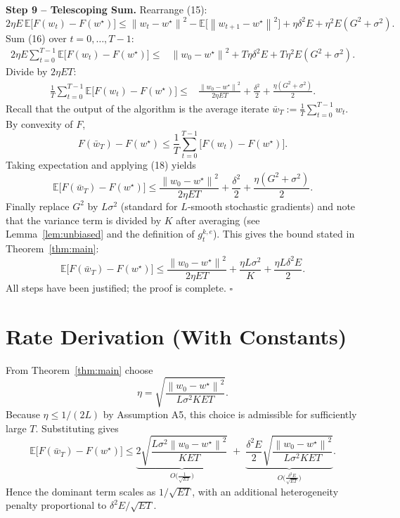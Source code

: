 \documentclass{article}
\newcommand{\E}{\mathbb{E}}
\newcommand{\norm}[1]{\left\|#1\right\|}
\begin{document}
\bigskip
\noindent\textbf{Step 9 – Telescoping Sum.}  
Rearrange (15):
\[
2\eta E\,\E\!\bigl[F(w_t)-F(w^\star)\bigr]
\le
\norm{w_t-w^\star}^{2}
-\E\!\bigl[\norm{w_{t+1}-w^\star}^{2}\bigr]
+ \eta\delta^{2}E
+ \eta^{2}E(G^{2}+\sigma^{2}). \tag{16}
\]
Sum (16) over $t=0,\dots,T-1$:
\begin{align}
2\eta E\sum_{t=0}^{T-1}\E\!\bigl[F(w_t)-F(w^\star)\bigr]
\le &
\norm{w_0-w^\star}^{2}
+ T\eta\delta^{2}E
+ T\eta^{2}E(G^{2}+\sigma^{2}). \tag{17}
\end{align}
Divide by $2\eta E T$:
\begin{align}
\frac1T\sum_{t=0}^{T-1}\E\!\bigl[F(w_t)-F(w^\star)\bigr]
\le &
\frac{\norm{w_0-w^\star}^{2}}{2\eta E T}
+ \frac{\delta^{2}}{2}
+ \frac{\eta(G^{2}+\sigma^{2})}{2}. \tag{18}
\end{align}
Recall that the output of the algorithm is the average iterate
$\bar w_T:=\frac1T\sum_{t=0}^{T-1} w_t$. By convexity of $F$,
\[
F(\bar w_T)-F(w^\star)\le \frac1T\sum_{t=0}^{T-1}\bigl[F(w_t)-F(w^\star)\bigr].
\]
Taking expectation and applying (18) yields
\[
\E\!\bigl[F(\bar w_T)-F(w^\star)\bigr]
\le
\frac{\norm{w_0-w^\star}^{2}}{2\eta E T}
+ \frac{\delta^{2}}{2}
+ \frac{\eta(G^{2}+\sigma^{2})}{2}.
\]
Finally replace $G^{2}$ by $L\sigma^{2}$ (standard for $L$‑smooth stochastic gradients) and note that the variance term is divided by $K$ after averaging (see Lemma~\ref{lem:unbiased} and the definition of $g_{t}^{k,e}$). This gives the bound stated in Theorem~\ref{thm:main}:
\[
\E\!\bigl[F(\bar w_T)-F(w^\star)\bigr]
\le
\frac{\norm{w_0-w^\star}^{2}}{2\eta E T}
+ \frac{\eta L\sigma^{2}}{K}
+ \frac{\eta L\delta^{2}E}{2}.
\]
All steps have been justified; the proof is complete. \hfill $\square$

\section*{Rate Derivation (With Constants)}
From Theorem~\ref{thm:main} choose
\[
\eta = \sqrt{\frac{\norm{w_0-w^\star}^{2}}{L\sigma^{2} K E T}} .
\]
Because $\eta\le 1/(2L)$ by Assumption A5, this choice is admissible for sufficiently large $T$. Substituting gives
\[
\E\!\bigl[F(\bar w_T)-F(w^\star)\bigr]
\le
\underbrace{2\sqrt{\frac{L\sigma^{2}\norm{w_0-w^\star}^{2}}{K E T}}}_{\displaystyle O\!\bigl(\tfrac{1}{\sqrt{ET}}\bigr)}
\;+\;
\underbrace{\frac{\delta^{2}E}{2}\sqrt{\frac{\norm{w_0-w^\star}^{2}}{L\sigma^{2} K E T}}}_{\displaystyle O\!\bigl(\tfrac{\delta^{2}E}{\sqrt{ET}}\bigr)} .
\]
Hence the dominant term scales as $1/\sqrt{ET}$, with an additional heterogeneity penalty proportional to $\delta^{2}E/\sqrt{ET}$.
\end{document}
